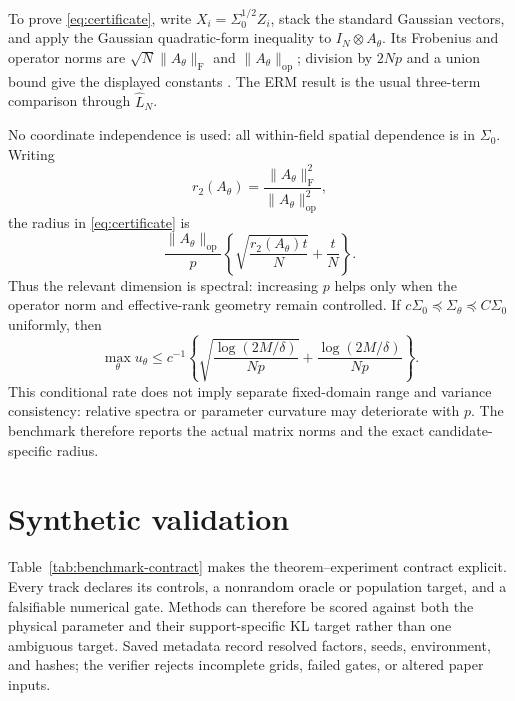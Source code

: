 \documentclass[sigconf]{acmart}
\theoremstyle{remark}
\begin{document}
To prove \eqref{eq:certificate}, write \(X_i=\Sigma_0^{1/2}Z_i\), stack the
standard Gaussian vectors, and apply the Gaussian quadratic-form inequality to
\(I_N\otimes A_\theta\). Its Frobenius and operator norms are
\(\sqrt N\lVert A_\theta\rVert_{\mathrm F}\) and
\(\lVert A_\theta\rVert_{\mathrm{op}}\); division by \(2Np\) and a union bound
give the displayed constants \cite{laurent2000quadratic,hsu2012quadratic}.
The ERM result is the usual three-term comparison through
\(\widehat L_N\).

No coordinate independence is used: all within-field spatial dependence is in
\(\Sigma_0\). Writing
\[
 r_2(A_\theta)=
 \frac{\lVert A_\theta\rVert_{\mathrm F}^2}{\lVert A_\theta\rVert_{\mathrm{op}}^2},
\]
the radius in \eqref{eq:certificate} is
\[
 \frac{\lVert A_\theta\rVert_{\mathrm{op}}}p
 \left\{\sqrt{\frac{r_2(A_\theta)t}{N}}+\frac tN\right\}.
\]
Thus the relevant dimension is spectral: increasing \(p\) helps only when
the operator norm and effective-rank geometry remain controlled. If
\(c\Sigma_0\preceq\Sigma_\theta\preceq C\Sigma_0\) uniformly, then
\begin{equation}
 \max_\theta u_\theta\leq c^{-1}\left\{
 \sqrt{\frac{\log(2M/\delta)}{Np}}
 +\frac{\log(2M/\delta)}{Np}\right\}.
 \label{eq:np-rate}
\end{equation}
This conditional rate does not imply separate fixed-domain range and variance
consistency: relative spectra or parameter curvature may deteriorate with
\(p\). The benchmark therefore reports the actual matrix norms and the exact
candidate-specific radius.

\section{Synthetic validation}

Table~\ref{tab:benchmark-contract} makes the theorem--experiment contract
explicit. Every track declares its controls, a nonrandom oracle or population
target, and a falsifiable numerical gate. Methods can therefore be scored
against both the physical parameter and their support-specific KL target rather
than one ambiguous target. Saved metadata record resolved factors, seeds,
environment, and hashes; the verifier rejects incomplete grids, failed gates,
or altered paper inputs.
\end{document}
